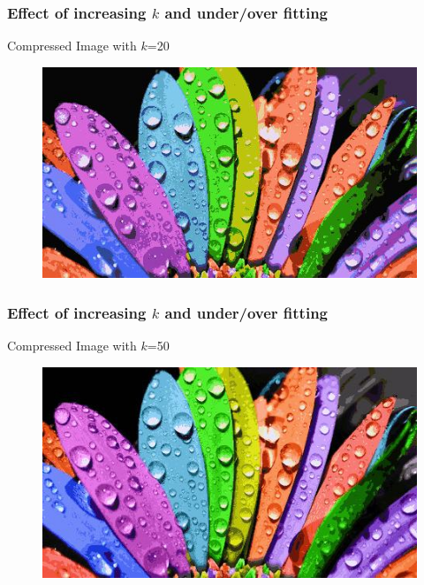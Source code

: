 \documentclass{beamer}
\begin{document}
\begin{frame}
\frametitle{Effect of increasing $k$ and under/over fitting}
\begin{center}
Compressed Image with $k$=20
\end{center}
\begin{figure}
\includegraphics[scale=0.7]{flower_compressed_20.jpg}
\end{figure}
\end{frame}

\begin{frame}
\frametitle{Effect of increasing $k$ and under/over fitting}
\begin{center}
Compressed Image with $k$=50
\end{center}
\begin{figure}
\includegraphics[scale=0.7]{flower_compressed_50.jpg}
\end{figure}
\end{frame}
\end{document}
